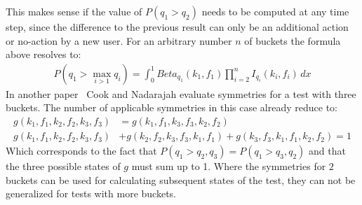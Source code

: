 \documentclass[../Thesis.tex]{subfiles}
\begin{document}
This makes sense if the value of $P(q_1>q_2)$ needs to be computed at any time step, since the difference to the previous result can only be an additional action or no-action by a new user. For an arbitrary number $n$ of buckets the formula above resolves to:
\begin{align*}
P(q_1> \max_{i>1}q_i)=\int_{0}^{1}Beta_{q_1}(k_1,f_1) \prod_{i=2}^{n} I_{q_i}(k_i,f_i)\,dx
\end{align*}
In another paper~\cite{cook2006stochastic} Cook and Nadarajah evaluate symmetries for a test with three buckets. The number of applicable symmetries in this case already reduce to:
\begin{align*}
g(k_1,f_1,k_2,f_2,k_3,f_3) &= g(k_1,f_1,k_3,f_3,k_2,f_2) \\
g(k_1,f_1,k_2,f_2,k_3,f_3) &+ g(k_2,f_2,k_3,f_3,k_1,f_1) + g(k_3,f_3,k_1,f_1,k_2,f_2) = 1
\end{align*}
Which corresponds to the fact that $P(q_1>q_2,q_3) = P(q_1>q_3,q_2)$ and that the three possible states of $g$ must sum up to 1. Where the symmetries for $2$ buckets can be used for calculating subsequent states of the test, they can not be generalized for tests with more buckets. 
\end{document}
